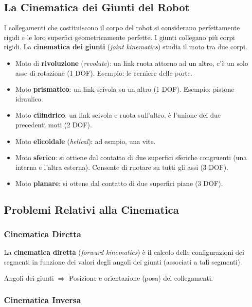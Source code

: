 \documentclass[a4paper,portrait,12pt]{article}
\theoremstyle{definition}
\begin{document}
\subsection{La Cinematica dei Giunti del Robot}


I collegamenti che costituiscono il corpo del robot si considerano perfettamente rigidi e le loro superfici geometricamente perfette.
I giunti collegano più corpi rigidi.
La \textbf{cinematica dei giunti} (\emph{joint kinematics}) studia il moto tra due corpi.

\begin{itemize}
\item Moto di \textbf{rivoluzione} (\emph{revolute}): un link ruota attorno ad un altro, c'è un solo asse di rotazione (1 DOF). Esempio: le cerniere delle porte.
\item Moto \textbf{prismatico}: un link scivola su un altro (1 DOF). Esempio: pistone idraulico.
\item Moto \textbf{cilindrico}: un link scivola e ruota sull'altro, è l'unione dei due precedenti moti (2 DOF).
\item Moto \textbf{elicoidale} (\emph{helical}): ad esmpio, una vite.
\item Moto \textbf{sferico}: si ottiene dal contatto di due superfici sferiche congruenti (una interna e l'altra esterna). Consente di ruotare su tutti gli assi (3 DOF).
\item Moto \textbf{planare}: si ottene dal contatto di due superfici piane (3 DOF).
\end{itemize}


\subsection{Problemi Relativi alla Cinematica}

\subsubsection{Cinematica Diretta}

La \textbf{cinematica diretta} (\emph{forward kinematics}) è il calcolo delle configurazioni dei segmenti in funzione dei valori degli angoli dei giunti (associati a tali segmenti).
\begin{center}
Angoli dei giunti $\Rightarrow$ Posizione e orientazione (posa) dei collegamenti.
\end{center}

\subsubsection{Cinematica Inversa}
\end{document}
